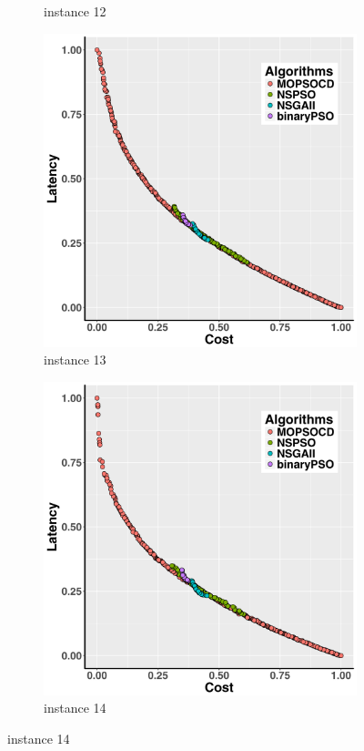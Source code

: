 \documentclass[10pt,journal,compsoc]{IEEEtran}
\begin{document}
\begin{figure}[ht]
\begin{subfigure}{0.21\linewidth}
    \caption{instance 12}
   \end{subfigure}
      \begin{subfigure}{0.21\linewidth}
       \includegraphics[width=\textwidth]{pics/total13.png}
    \caption{instance 13}
   \end{subfigure}
      \begin{subfigure}{0.21\linewidth}
       \includegraphics[width=\textwidth]{pics/total14.png}
    \caption{instance 14}
   \end{subfigure}
   \label{fig:total}
\end{figure}
\end{document}
